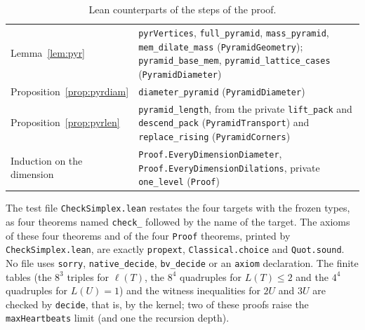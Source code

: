 \documentclass[11pt]{article}
\theoremstyle{definition}
\theoremstyle{remark}
\begin{document}
{\begin{table}[ht]
\begin{tabular}{@{}>{\raggedright\arraybackslash}p{}>{\raggedright\arraybackslash}p{}@{}}
Lemma~\ref{lem:pyr} &
\texttt{pyrVertices}, \texttt{full\_pyramid}, \texttt{mass\_pyramid},
\texttt{mem\_dilate\_mass} (\texttt{PyramidGeometry});
\texttt{pyramid\_base\_mem}, \texttt{pyramid\_lattice\_cases}
(\texttt{PyramidDiameter}) \\
Proposition~\ref{prop:pyrdiam} &
\texttt{diameter\_pyramid} (\texttt{PyramidDiameter}) \\
Proposition~\ref{prop:pyrlen} &
\texttt{pyramid\_length}, from the private \texttt{lift\_pack} and
\texttt{descend\_pack} (\texttt{PyramidTransport}) and
\texttt{replace\_rising} (\texttt{PyramidCorners}) \\
Induction on the dimension & \texttt{Proof.EveryDimensionDiameter},
\texttt{Proof.EveryDimensionDilations}, private \texttt{one\_level}
(\texttt{Proof}) \\
\hline
\end{tabular}
\caption{Lean counterparts of the steps of the proof.}
\label{tab:lean}
\end{table}

\noindent The test file \texttt{CheckSimplex.lean} restates the four targets
with the frozen types, as four theorems named \texttt{check\_} followed by
the name of the target. The axioms of these four
theorems and of the four \texttt{Proof} theorems, printed by
\texttt{CheckSimplex.lean}, are exactly \texttt{propext},
\texttt{Classical.choice} and \texttt{Quot.sound}. No file uses
\texttt{sorry}, \texttt{native\_\allowbreak decide},
\texttt{bv\_\allowbreak decide} or an \texttt{axiom} declaration. The finite
tables (the $8^3$ triples for $\ell(T)$, the $8^4$ quadruples for $L(T)\le2$
and the $4^4$ quadruples for $L(U)=1$) and the witness inequalities for $2U$
and $3U$ are checked by \texttt{decide}, that is, by the kernel; two of these
proofs raise the \texttt{maxHeartbeats} limit (and one the recursion depth).

}
\end{document}
